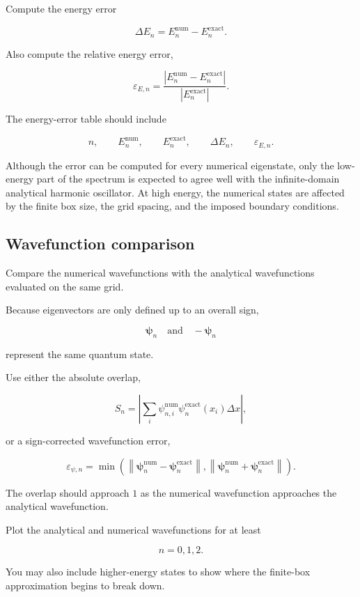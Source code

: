 Compute the energy error

\[
\Delta E_n
=
E_n^{\mathrm{num}}
-
E_n^{\mathrm{exact}}.
\]

Also compute the relative energy error,

\[
\varepsilon_{E,n}
=
\frac{
\left|
E_n^{\mathrm{num}}
-
E_n^{\mathrm{exact}}
\right|
}{
\left|
E_n^{\mathrm{exact}}
\right|
}.
\]

The energy-error table should include

\[
n,
\qquad
E_n^{\mathrm{num}},
\qquad
E_n^{\mathrm{exact}},
\qquad
\Delta E_n,
\qquad
\varepsilon_{E,n}.
\]

Although the error can be computed for every numerical eigenstate, only the low-energy part of the spectrum is expected to agree well with the infinite-domain analytical harmonic oscillator. At high energy, the numerical states are affected by the finite box size, the grid spacing, and the imposed boundary conditions.

\subsection{Wavefunction comparison}

Compare the numerical wavefunctions with the analytical wavefunctions evaluated on the same grid.

Because eigenvectors are only defined up to an overall sign,

\[
\boldsymbol{\psi}_n
\quad\text{and}\quad
-\boldsymbol{\psi}_n
\]

represent the same quantum state.

Use either the absolute overlap,

\[
S_n
=
\left|
\sum_i
\psi_{n,i}^{\mathrm{num}}
\psi_n^{\mathrm{exact}}(x_i)
\Delta x
\right|,
\]

or a sign-corrected wavefunction error,

\[
\varepsilon_{\psi,n}
=
\min
\left(
\left\|
\boldsymbol{\psi}_n^{\mathrm{num}}
-
\boldsymbol{\psi}_n^{\mathrm{exact}}
\right\|,
\left\|
\boldsymbol{\psi}_n^{\mathrm{num}}
+
\boldsymbol{\psi}_n^{\mathrm{exact}}
\right\|
\right).
\]

The overlap should approach \(1\) as the numerical wavefunction approaches the analytical wavefunction.

Plot the analytical and numerical wavefunctions for at least

\[
n=0,1,2.
\]

You may also include higher-energy states to show where the finite-box approximation begins to break down.

